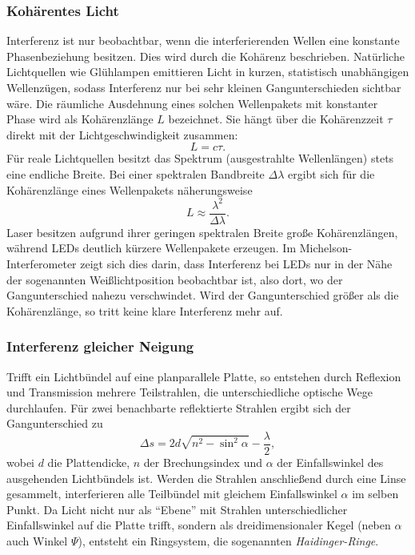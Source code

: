 \subsubsection[Kohärenz]{Kohärentes Licht}
Interferenz ist nur beobachtbar, wenn die interferierenden Wellen eine konstante Phasenbeziehung besitzen. Dies wird durch die Kohärenz beschrieben. Natürliche Lichtquellen wie Glühlampen emittieren Licht in kurzen, statistisch unabhängigen Wellenzügen, sodass Interferenz nur bei sehr kleinen Gangunterschieden sichtbar wäre.  
Die räumliche Ausdehnung eines solchen Wellenpakets mit konstanter Phase wird als Kohärenzlänge \(L\) bezeichnet. Sie hängt über die Kohärenzzeit \(\tau\) direkt mit der Lichtgeschwindigkeit zusammen:
\begin{equation}
    \label{KohLaenge}
    L = c \tau.
\end{equation}
Für reale Lichtquellen besitzt das Spektrum (ausgestrahlte Wellenlängen) stets eine endliche Breite. Bei einer spektralen Bandbreite \(\Delta \lambda\) ergibt sich für die Kohärenzlänge eines Wellenpakets näherungsweise
\begin{equation}
    \label{KohLaengeSpektrum}
    L \approx \frac{\lambda^2}{\Delta \lambda}.
\end{equation}
Laser besitzen aufgrund ihrer geringen spektralen Breite große Kohärenzlängen, während LEDs deutlich kürzere Wellenpakete erzeugen.
Im Michelson-Interferometer zeigt sich dies darin, dass Interferenz bei LEDs nur in der Nähe der sogenannten Weißlichtposition beobachtbar ist, also dort, wo der Gangunterschied nahezu verschwindet. Wird der Gangunterschied größer als die Kohärenzlänge, so tritt keine klare Interferenz mehr auf. 

\subsubsection{Interferenz gleicher Neigung}
Trifft ein Lichtbündel auf eine planparallele Platte, so entstehen durch Reflexion und Transmission mehrere Teilstrahlen, die unterschiedliche optische Wege durchlaufen.
Für zwei benachbarte reflektierte Strahlen ergibt sich der Gangunterschied zu
\begin{equation}
    \label{eq:GangunterschiedNeigung}
    \Delta s = 2 d \sqrt{n^2 - \sin^2 \alpha} - \frac{\lambda}{2},
\end{equation}
wobei \(d\) die Plattendicke, \(n\) der Brechungsindex und \(\alpha\) der Einfallswinkel des ausgehenden Lichtbündels ist.  
Werden die Strahlen anschließend durch eine Linse gesammelt, interferieren alle Teilbündel mit gleichem Einfallswinkel \(\alpha\) im selben Punkt. Da Licht nicht nur als \enquote{Ebene} mit Strahlen unterschiedlicher Einfallswinkel auf die Platte trifft, sondern als dreidimensionaler Kegel (neben \(\alpha\) auch Winkel \(\Psi\)), entsteht ein Ringsystem, die sogenannten \textit{Haidinger-Ringe}.  


